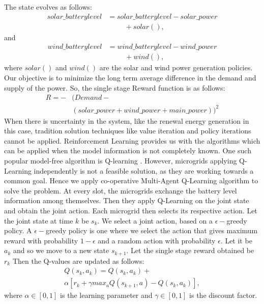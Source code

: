 \documentclass[conference]{IEEEtran}
\begin{document}
The state evolves as follows:
\begin{equation}
\begin{split}
solar\_batterylevel &= solar\_batterylevel - solar\_power \\&\hspace{1cm}+ solar(), 
\end{split}
\end{equation}
and
\begin{equation}
\begin{split}
wind\_batterylevel &= wind\_batterylevel - wind\_power 
\\&\hspace{1cm}  + wind(),
\end{split}
\end{equation}
where
$solar()$ and $wind()$ are the solar and wind power generation policies. 
Our objective is to minimize the long term average difference in the demand and supply of the power. So, the single stage Reward function is as follows:
\begin{equation}
\begin{split}
R = -&(Demand - \\
&(solar\_power+wind\_power+main\_power))^2
\end{split}
\end{equation}
When there is uncertainty in the system, like the renewal energy generation in this case, tradition solution techniques like value iteration and policy iterations cannot be applied. Reinforcement Learning provides us with the algorithms which can be applied when the model information is not completely known. One such popular model-free algorithm is Q-learning \cite{vol2}. However, microgrids applying Q-Learning independently is not a feasible solution, as they are working towards a common goal. Hence we apply co-operative Multi-Agent Q-Learning algorithm \cite{marl} to solve the problem. At every slot, the microgrids exchange the battery level information among themselves. Then they apply Q-Learning on the joint state and obtain the joint action. Each microgrid then selects its respective action. Let the joint state at time $k$ be $s_{k}$. We select a joint action, based on a $\epsilon-$greedy policy. A $\epsilon-$greedy policy is one where we select the action that gives maximum reward with probability $1-\epsilon$ and a random action with probability $\epsilon$. Let it be $a_{k}$ and so we move to a new state $s_{k+1}$. Let the single stage reward obtained be $r_{k}$ Then the Q-values are updated as follows:
\begin{equation}\label{Q-val}
\begin{split}
Q(s_{k},a_{k}) = Q(s_{k},a_{k}) + \\
 \alpha[r_{k}+\gamma max_{a}Q(s_{k+1},a) - Q(s_{k},a_{k})], 
\end{split}
\end{equation}
where $\alpha \in [0,1]$ is the learning parameter and $\gamma \in [0,1]$ is the discount factor.
\end{document}

